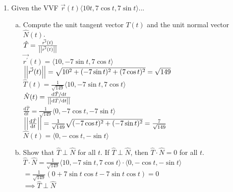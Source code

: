 \begin{enumerate}
	\item Given the VVF $\vec{r}(t)\langle 10t, 7\cos{t}, 7\sin{t} \rangle$...\\
	\begin{enumerate}[a.]
		\item Compute the unit tangent vector $\hat{T}(t)$ and the unit normal vector $\hat{N}(t)$.\\
		\indent
		$\hat{T} = \frac{\vec{r^\prime}(t)}{\left|\left|\vec{r^\prime}(t)\right|\right|}$\\
		$\vec{r^\prime}(t) = \langle 10, -7\sin{t}, 7\cos{t} \rangle$\\
		$\left|\left|\vec{r^\prime}(t)\right|\right| = \sqrt{10^2 + (-7\sin{t})^2 + (7\cos{t})^2} = \sqrt{149}$\\
		$\hat{T}(t) = \frac{1}{\sqrt{149}}\langle 10, -7\sin{t}, 7\cos{t} \rangle$\\
		$\hat{N}(t) = \frac{\mathrm{d}\hat{T}/\mathrm{d}t}{\left|\left|\mathrm{d}\hat{T}/\mathrm{d}t\right|\right|}$\\
		$\frac{\mathrm{d}\hat{T}}{\mathrm{d}t} = \frac{1}{\sqrt{149}} \langle 0, -7\cos{t}, -7\sin{t} \rangle$\\
		$\left|\left|\frac{\mathrm{d}\hat{T}}{\mathrm{d}t}\right|\right| = \frac{1}{\sqrt{149}}\sqrt{(-7\cos{t})^2 + (-7\sin{t})^2} = \frac{7}{\sqrt{149}}$\\
		$\hat{N}(t) = \langle 0, -\cos{t},-\sin{t}\rangle$
		
		\item Show that $\hat{T}\perp\hat{N}$ for all $t$.
		\indent
		If $\hat{T}\perp\hat{N}$, then $\hat{T}\cdot\hat{N} = 0$ for all $t$.\\
		$\hat{T} \cdot \hat{N} = \frac{1}{\sqrt{149}}\langle 10, -7\sin{t}, 7\cos{t} \rangle \cdot \langle 0, -\cos{t}, -\sin{t}\rangle$\\
		$= \frac{1}{\sqrt{149}}(0 + 7\sin{t}\cos{t} - 7\sin{t}\cos{t}) = 0$\\
		$\implies \hat{T}\perp\hat{N}$\\
	\end{enumerate}
	

\end{enumerate}
